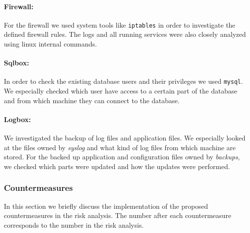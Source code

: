 \documentclass[english]{article}
\newcommand{\code}[1]{\texttt{#1}}
\begin{document}
\paragraph{Firewall:} For the firewall we used system tools like \code{iptables} in order to investigate the defined firewall rules. The logs and all running services were also closely analyzed using linux internal commands.  

\paragraph{Sqlbox:} In order to check the existing database users and their privileges we used \code{mysql}. We especially checked which user have access to a certain part of the database and from which machine they can connect to the database.

\paragraph{Logbox:} We investigated the backup of log files and application files. We especially looked at the files owned by \textit{syslog} and what kind of log files from which machine are stored. For the backed up application and configuration files owned by \textit{backups}, we checked which parts were updated and how the updates were performed.


\subsubsection{Countermeasures}
In this section we briefly discuss the implementation of the proposed countermeasures in the risk analysis. The number after each countermeasure corresponds to the number in the risk analysis.
\end{document}
